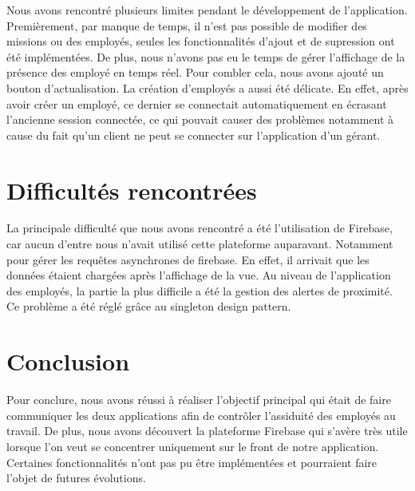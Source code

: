 \documentclass{article}
\begin{document}
Nous avons rencontré plusieurs limites pendant le développement de l'application. 
Premièrement, par manque de temps, il n'est pas possible de modifier des missions ou des employés, seules les fonctionnalités d'ajout et de supression ont été implémentées. 
De plus, nous n'avons pas eu le temps de gérer l'affichage de la présence des employé en temps réel. Pour combler cela, nous avons ajouté un bouton d'actualisation. 
La création d’employés a aussi été délicate. En effet, après avoir créer un employé, ce dernier se connectait automatiquement en écrasant l’ancienne session connectée, ce qui pouvait causer des problèmes notamment à cause du fait qu’un client ne peut se connecter sur l'application d’un gérant.

\section{Difficultés rencontrées }

La principale difficulté que nous avons rencontré a été l'utilisation de Firebase, car aucun d'entre nous n'avait utilisé cette plateforme auparavant. Notamment pour gérer les requêtes asynchrones de firebase. En effet, il arrivait que les données étaient chargées après l'affichage de la vue. 
Au niveau de l'application des employés, la partie la plus difficile a été la gestion des alertes de proximité. Ce problème a été réglé grâce au singleton design pattern.

\section{Conclusion}

Pour conclure, nous avons réussi à réaliser l'objectif principal qui était de faire communiquer les deux applications afin de contrôler l'assiduité des employés au travail. 
De plus, nous avons découvert la plateforme Firebase qui s'avère très utile lorsque l'on veut se concentrer uniquement sur le front de notre application. 
Certaines fonctionnalités n'ont pas pu être implémentées et pourraient faire l'objet de futures évolutions. 




\end{document}
